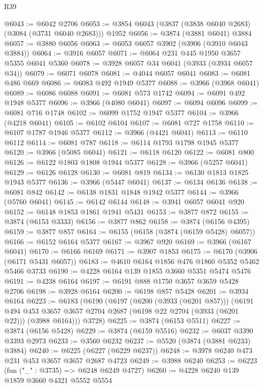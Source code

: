 \begin{lexlean}{R39}
\begin{coremodule}
@6043 := @6042 @2706
@6053 := @3854 @6043 (@3837 (@3838 @6040 @2683) (@3084 (@3731 @6040 @2683))) @1952
@6056 := @3874 (@3881 @6041) @3884
@6057 := @3880 @6056
@6063 := @6053 @6057 @3902 (@3906 (@3910 @6043 @3884))
@6064 := @3916 @6057
@6071 := @6064 @231 @445 @1950 @3657 @5355 @6041 @5360
@6078 := @3928 @6057 @34 @6041 (@3933 (@3934 @6057 @34))
@6079 := @6071 @6078
@6081 := @4044 @6057 @6041
@6083 := @6081 @486 @669
@6086 := @6083 @492 @1949 @5377
@6088 := @3966 (@3968 @6041)
@6089 := @6086 @6088
@6091 := @6081 @573 @1742
@6094 := @6091 @492 @1948 @5377
@6096 := @3966 (@4080 @6041)
@6097 := @6094 @6096
@6099 := @6081 @716 @1748
@6102 := @6099 @1752 @1947 @5377
@6104 := @3966 (@4218 @6041)
@6105 := @6102 @6104
@6107 := @6081 @727 @1758
@6110 := @6107 @1787 @1946 @5377
@6112 := @3966 (@4421 @6041)
@6113 := @6110 @6112
@6114 := @6081 @787
@6118 := @6114 @1793 @1798 @1945 @5377
@6120 := @3966 (@5085 @6041)
@6121 := @6118 @6120
@6122 := @6081 @800
@6126 := @6122 @1803 @1808 @1944 @5377
@6128 := @3966 (@5257 @6041)
@6129 := @6126 @6128
@6130 := @6081 @819
@6134 := @6130 @1813 @1825 @1943 @5377
@6136 := @3966 (@5447 @6041)
@6137 := @6134 @6136
@6138 := @6081 @842
@6142 := @6138 @1831 @1848 @1942 @5377
@6144 := @3966 (@5760 @6041)
@6145 := @6142 @6144
@6148 := @3941 @6057 @6041 @920
@6152 := @6148 @1853 @1861 @1941 @5431
@6153 := @3877 @872
@6155 := @3874 (@6153 @3333)
@6156 := @3877 @862
@6158 := @3874 (@6156 @4395)
@6159 := @3877 @857
@6164 := @6155 (@6158 (@3874 (@6159 @5428) @6057))
@6166 := @6152 @6164 @5377
@6167 := @3967 @920
@6169 := @3966 (@6167 @6041)
@6170 := @6166 @6169
@6171 := @3907 @1853
@6175 := @6170 (@3906 (@6171 @5431 @6057))
@6183 := @4610 @6164 @1856 @476 @1860 @5352 @5462 @5466 @3733
@6190 := @4228 @6164 @139 @1855 @3660 @5351 @5474 @5476
@6191 := @4238 @6164
@6197 := @6191 @888 @1750 @3657 @3659 @5428 @2706
@6198 := @3928 @6164
@6200 := @6198 @857 @5428
@6201 := @3934 @6164
@6223 := @6183
    (@6190
      (@6197
        (@6200 (@3933 (@6201 @857)))
        (@6191
          @494
          @453
          @3657
          @3657
          @2704
          @2687
          (@6198 @22 @2704 (@3933 (@6201 @22)))
          (@3988 @6164)))
      @3728)
@6225 := @3874 (@6153 @5511)
@6227 := @3874 (@6156 @5428)
@6229 := @3874 (@6159 @5516)
@6232 := @6037 @3390 @3393 @2973
@6233 := @3560 @6232
@6237 := @5520 (@3874 (@3881 @6233) @3884)
@6240 := @6225 (@6227 (@6229 @6237))
@6248 := @3978 @6240 @473 @231 @453 @3657 @3657 @2687 @4723
@6249 := @3988 @6240
@6253 := @6223 (fun ("_" : @3735) => @6248 @6249 @4727)
@6260 := @4228 @6240 @139 @1859 @3660 @4321 @5552 @5554

\end{coremodule}
\end{lexlean}

